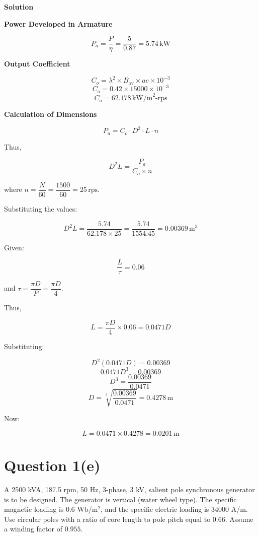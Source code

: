 \documentclass[12pt]{article}
\begin{document}
\vspace{10pt}

\noindent
\textbf{Solution}

\vspace{5pt}

\noindent
\textbf{Power Developed in Armature}

\[
P_a = \frac{P}{\eta} = \frac{5}{0.87} = 5.74\, \text{kW}
\]

\vspace{5pt}

\noindent
\textbf{Output Coefficient}

\[
C_o = \lambda^2 \times B_{\text{av}} \times ac \times 10^{-3}
\]
\[
C_o = 0.42 \times 15000 \times 10^{-3}
\]
\[
C_o = 62.178\, \text{kW/m}^2\text{-rps}
\]

\vspace{5pt}

\noindent
\textbf{Calculation of Dimensions}

\[
P_a = C_o \cdot D^2 \cdot L \cdot n
\]

Thus,

\[
D^2 L = \frac{P_a}{C_o \times n}
\]

where $n = \dfrac{N}{60} = \dfrac{1500}{60} = 25\, \text{rps}$.

Substituting the values:

\[
D^2 L = \frac{5.74}{62.178 \times 25} = \frac{5.74}{1554.45} = 0.00369\, \text{m}^3
\]

Given:

\[
\frac{L}{\tau} = 0.06
\]

and $\tau = \dfrac{\pi D}{P} = \dfrac{\pi D}{4}$.

Thus,

\[
L = \frac{\pi D}{4} \times 0.06 = 0.0471 D
\]

Substituting:

\[
D^2 (0.0471 D) = 0.00369
\]
\[
0.0471 D^3 = 0.00369
\]
\[
D^3 = \frac{0.00369}{0.0471}
\]
\[
D = \sqrt[3]{\frac{0.00369}{0.0471}} = 0.4278\, \text{m}
\]

Now:

\[
L = 0.0471 \times 0.4278 = 0.0201\, \text{m}
\]



\section*{Question 1(e)}

A 2500 kVA, 187.5 rpm, 50 Hz, 3-phase, 3 kV, salient pole synchronous generator is to be designed. The generator is vertical (water wheel type). The specific magnetic loading is $0.6$ Wb/m$^2$, and the specific electric loading is $34000$ A/m. Use circular poles with a ratio of core length to pole pitch equal to $0.66$. Assume a winding factor of $0.955$.
\end{document}
